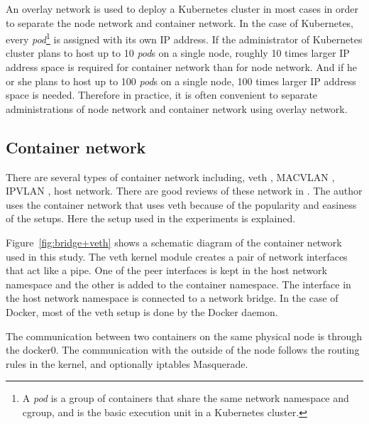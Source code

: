   An overlay network is used to deploy a Kubernetes cluster in most cases in order to separate the node network and container network.
  In the case of Kubernetes, every {\em pod}\footnote{A {\em pod} is a group of containers that share the same network namespace and cgroup, and is the basic execution unit in a Kubernetes cluster.} is assigned with its own IP address.
  If the administrator of Kubernetes cluster plans to host up to 10 {\em pod}s on a single node, roughly 10 times larger IP address space is required for container network than for node network.
  And if he or she plans to host up to 100 {\em pod}s on a single node, 100 times larger IP address space is needed. 
  Therefore in practice, it is often convenient to separate administrations of node network and container network using overlay network.


\subsection{Container network}

There are several types of container network including, veth \cite{bhattiprolu2008virtual}, MACVLAN \cite{rathore2010performance}, IPVLAN \cite{ipvlan}, host network.
There are good reviews of these network in  \cite{Marmol2015,claassen2016linux,struye2017assessing}.
The author uses the container network that uses veth because of the popularity and easiness of the setups.
Here the setup used in the experiments is explained.

Figure~\ref{fig:bridge+veth} shows a schematic diagram of the container network used in this study.
The veth kernel module creates a pair of network interfaces that act like a pipe.
One of the peer interfaces is kept in the host network namespace and the other is added to the container namespace.
The interface in the host network namespace is connected to a network bridge.
In the case of Docker, most of the veth setup is done by the Docker daemon.

The communication between two containers on the same physical node is through the docker0.
The communication with the outside of the node  follows the routing rules in the kernel,
and optionally  iptables Masquerade.  

